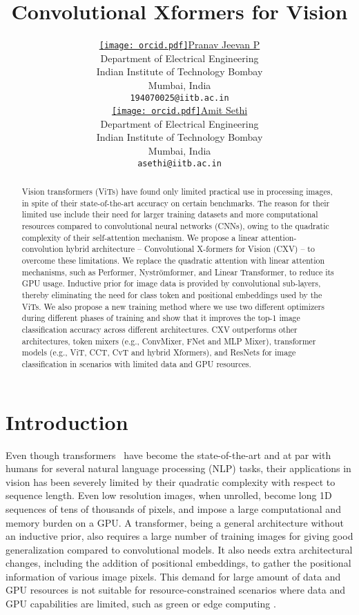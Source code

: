 \documentclass{article}
\title{Convolutional Xformers for Vision}
\author{ \href{https://orcid.org/0000-0003-4110-9638}{\texttt{[image: orcid.pdf]}\hspace{1mm}Pranav Jeevan P} \\
	Department of Electrical Engineering\\
	Indian Institute of Technology Bombay\\
	Mumbai, India  \\
	\texttt{194070025@iitb.ac.in} \\
\And
	\href{https://orcid.org/0000-0002-8003-6809}{\texttt{[image: orcid.pdf]}\hspace{1mm}Amit Sethi} \\
	Department of Electrical Engineering\\
	Indian Institute of Technology Bombay\\
	Mumbai, India \\
	\texttt{asethi@iitb.ac.in} \\
}
\date{}
\begin{document}
\maketitle

\begin{abstract}
Vision transformers (ViTs) have found only limited practical use in processing images, in spite of their state-of-the-art accuracy on certain benchmarks. The reason for their limited use include their need for larger training datasets and more computational  resources compared to convolutional neural networks (CNNs), owing to the quadratic complexity of their self-attention mechanism. We propose a linear attention-convolution hybrid architecture -- Convolutional X-formers for Vision (CXV) -- to overcome these limitations. We replace the quadratic attention with linear attention mechanisms, such as Performer, Nyströmformer, and Linear Transformer, to reduce its GPU usage. Inductive prior for image data is provided by convolutional sub-layers, thereby eliminating the need for class token and positional embeddings used by the ViTs. We also propose a new training method where we use two different optimizers during different phases of training and show that it improves the top-1 image classification accuracy across different architectures. CXV outperforms other architectures, token mixers (e.g., ConvMixer, FNet and MLP Mixer), transformer models (e.g., ViT, CCT, CvT and hybrid Xformers), and ResNets for image classification in scenarios with limited data and GPU resources.  

\end{abstract}




\section{Introduction}
\label{sec:intro}
Even though transformers~\cite{vaswani2017attention,devlin2019bert} have become the state-of-the-art and at par with humans for several natural language processing (NLP) tasks, their applications in vision has been severely limited by their quadratic complexity with respect to sequence length. Even low resolution images, when unrolled, become long 1D sequences of tens of thousands of pixels, and impose a large computational and memory burden on a GPU. A transformer, being a general architecture without an inductive prior, also requires a large number of training images for giving good generalization compared to convolutional models. It also needs extra architectural changes, including the addition of positional embeddings, to gather the positional information of various image pixels. This demand for large amount of data and GPU resources is not suitable for resource-constrained scenarios where data and GPU capabilities are limited, such as green or edge computing \cite{khan2021transformers}. 
\end{document}
